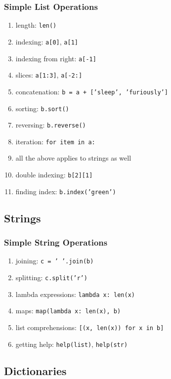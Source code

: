 \documentclass[handout]{beamer}
\begin{document}
\begin{frame}
  \frametitle{Simple List Operations}
  \small

\begin{enumerate}
\item length: \texttt{len()}
\item indexing: \texttt{a[0]}, \texttt{a[1]}
\item indexing from right: \texttt{a[-1]}
\item slices: \texttt{a[1:3]}, \texttt{a[-2:]}
\item concatenation: \texttt{b = a + ['sleep', 'furiously']}
\item sorting: \texttt{b.sort()}
\item reversing: \texttt{b.reverse()}
\item iteration: \texttt{for item in a:}
\item all the above applies to strings as well
\item double indexing: \texttt{b[2][1]}
\item finding index: \texttt{b.index('green')}
\end{enumerate}
\end{frame}

\subsection{Strings}

\begin{frame}
  \frametitle{Simple String Operations}
  \small

\begin{enumerate}
\item joining: \texttt{c = ' '.join(b)}
\item splitting: \texttt{c.split('r')}
\item lambda expressions: \texttt{lambda x: len(x)}
\item maps: \texttt{map(lambda x: len(x), b)}
\item list comprehensions: \texttt{[(x, len(x)) for x in b]}
\item getting help: \texttt{help(list)}, \texttt{help(str)}
\end{enumerate}
\end{frame}

\subsection{Dictionaries}
\end{document}
